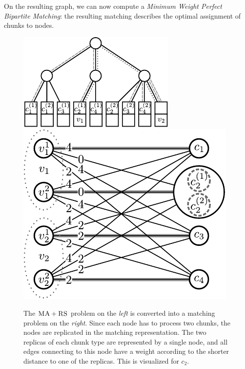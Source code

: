 \documentclass[9pt]{sigcomm-alternate}
\newcommand{\achunk}{\ensuremath{c}}
\newcommand{\RS}{\textsc{RS}}
\newcommand{\MA}{\textsc{MA}}
\begin{document}
On the resulting graph, we can now compute a \emph{Minimum Weight
Perfect Bipartite
Matching}:
the resulting matching describes the optimal assignment of chunks to nodes.


\begin{figure}
\includegraphics[width = 0.49\columnwidth]{figs/model_ma_r_cv_boxes}
\hfill
\includegraphics[width =0.49\columnwidth]{figs/matching}
\caption{The $\MA+\RS$ problem on the \emph{left} is converted into a
matching problem on the \emph{right}. Since each node has to process two
chunks, the
nodes are replicated in the matching representation. The two replicas of each
chunk type are represented by a single node, and all edges connecting to this
node have a weight according to the shorter distance to one of the replicas.
This is visualized for $\achunk_2$.}
\label{fig:matching}
\end{figure}
\end{document}
